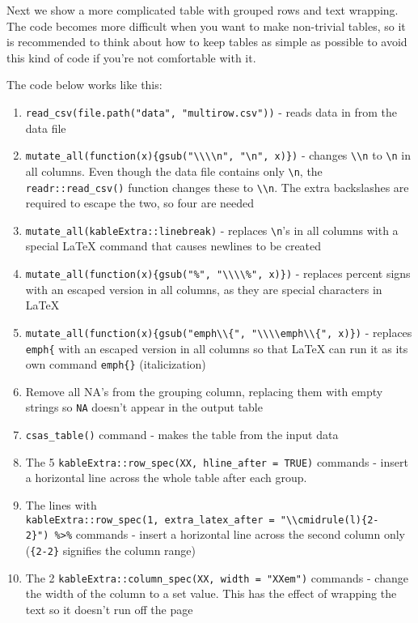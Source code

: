 \documentclass[12pt]{article}\usepackage[]{graphicx}\usepackage[]{color}
\begin{document}
Next we show a more complicated table with grouped rows and text wrapping. The code becomes more difficult when you want to make non-trivial tables, so it is recommended to think about how to keep tables as simple as possible to avoid this kind of code if you're not comfortable with it.

The code below works like this:
\begin{enumerate}
\def\labelenumi{\arabic{enumi}.}

\item
  \texttt{read\_csv(file.path("data",\ "multirow.csv"))} - reads data in from the data file
\item
  \texttt{mutate\_all(function(x)\{gsub("\textbackslash{}\textbackslash{}\textbackslash{}\textbackslash{}n",\ "\textbackslash{}n",\ x)\})} - changes \texttt{\textbackslash{}\textbackslash{}n} to \texttt{\textbackslash{}n} in all columns. Even though the data file contains only \texttt{\textbackslash{}n}, the \texttt{readr::read\_csv()} function changes these to \texttt{\textbackslash{}\textbackslash{}n}. The extra backslashes are required to escape the two, so four are needed
\item
  \texttt{mutate\_all(kableExtra::linebreak)} - replaces \texttt{\textbackslash{}n}'s in all columns with a special LaTeX command that causes newlines to be created
\item
  \texttt{mutate\_all(function(x)\{gsub("\%",\ "\textbackslash{}\textbackslash{}\textbackslash{}\textbackslash{}\%",\ x)\})} - replaces percent signs with an escaped version in all columns, as they are special characters in LaTeX
\item
  \texttt{mutate\_all(function(x)\{gsub("emph\textbackslash{}\textbackslash{}\{",\ "\textbackslash{}\textbackslash{}\textbackslash{}\textbackslash{}emph\textbackslash{}\textbackslash{}\{",\ x)\})} - replaces \texttt{emph\{} with an escaped version in all columns so that LaTeX can run it as its own command \texttt{emph\{\}} (italicization)
\item
  Remove all NA's from the grouping column, replacing them with empty strings so \texttt{NA} doesn't appear in the output table
\item
  \texttt{csas\_table()} command - makes the table from the input data
\item
  The 5 \texttt{kableExtra::row\_spec(XX,\ hline\_after\ =\ TRUE)} commands - insert a horizontal line across the whole table after each group.
\item
  The lines with \texttt{kableExtra::row\_spec(1,\ extra\_latex\_after\ =\ "\textbackslash{}\textbackslash{}cmidrule(l)\{2-2\}")\ \%\textgreater{}\%} commands - insert a horizontal line across the second column only (\texttt{\{2-2\}} signifies the column range)
\item
  The 2 \texttt{kableExtra::column\_spec(XX,\ width\ =\ "XXem")} commands - change the width of the column to a set value. This has the effect of wrapping the text so it doesn't run off the page
\end{enumerate}
\end{document}

